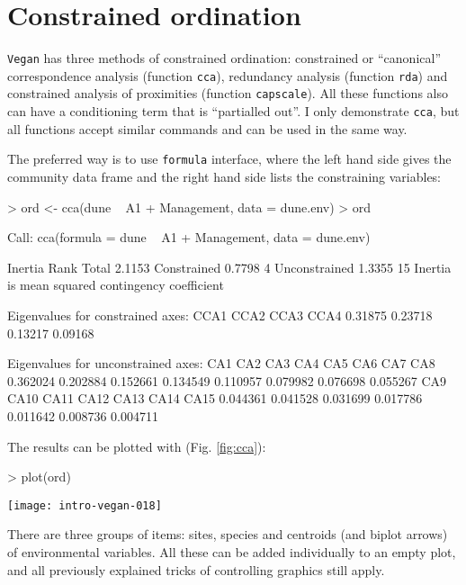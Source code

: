 \documentclass[a4paper,10pt]{amsart}
\begin{document}
\section{Constrained ordination}

\texttt{Vegan} has three methods of constrained ordination:
constrained or ``canonical'' correspondence analysis (function
\texttt{cca}), redundancy analysis (function \texttt{rda}) and
constrained analysis of proximities (function \texttt{capscale}).  All
these functions also can have a conditioning term that is ``partialled
out''.  I only demonstrate \texttt{cca}, but all functions accept
similar commands and can be used in the same way.

The preferred way is to use \texttt{formula} interface, where the left
hand side gives the community data frame and the right hand side lists
the constraining variables:
\begin{Schunk}
\begin{Sinput}
> ord <- cca(dune ~ A1 + Management, data = dune.env)
> ord
\end{Sinput}
\begin{Soutput}
Call:
cca(formula = dune ~ A1 + Management, data = dune.env) 

              Inertia Rank
Total          2.1153     
Constrained    0.7798    4
Unconstrained  1.3355   15
Inertia is mean squared contingency coefficient 

Eigenvalues for constrained axes:
   CCA1    CCA2    CCA3    CCA4 
0.31875 0.23718 0.13217 0.09168 

Eigenvalues for unconstrained axes:
     CA1      CA2      CA3      CA4      CA5      CA6      CA7      CA8 
0.362024 0.202884 0.152661 0.134549 0.110957 0.079982 0.076698 0.055267 
     CA9     CA10     CA11     CA12     CA13     CA14     CA15 
0.044361 0.041528 0.031699 0.017786 0.011642 0.008736 0.004711 
\end{Soutput}
\end{Schunk}
The results can be plotted with (Fig. \ref{fig:cca}):
\begin{Schunk}
\begin{Sinput}
> plot(ord)
\end{Sinput}
\end{Schunk}
\begin{SCfigure}
\texttt{[image: intro-vegan-018]}
\caption{Default plot from constrained correspondence analysis.}
\label{fig:cca}
\end{SCfigure}
There are three groups of items: sites, species and centroids (and
biplot arrows) of environmental variables.  All these can be added
individually to an empty plot, and all previously explained tricks of
controlling graphics still apply.
\end{document}
